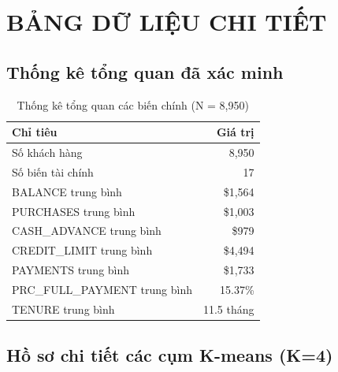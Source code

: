 ﻿\chapter{BẢNG DỮ LIỆU CHI TIẾT}

\section{Thống kê tổng quan đã xác minh}

\begin{table}[H]
\centering
\caption{Thống kê tổng quan các biến chính (N = 8,950)}
\begin{tabular}{|l|r|}
\hline
\textbf{Chỉ tiêu} & \textbf{Giá trị} \\
\hline
Số khách hàng & 8,950 \\
\hline
Số biến tài chính & 17 \\
\hline
BALANCE trung bình & \$1,564 \\
\hline
PURCHASES trung bình & \$1,003 \\
\hline
CASH\_ADVANCE trung bình & \$979 \\
\hline
CREDIT\_LIMIT trung bình & \$4,494 \\
\hline
PAYMENTS trung bình & \$1,733 \\
\hline
PRC\_FULL\_PAYMENT trung bình & 15.37\% \\
\hline
TENURE trung bình & 11.5 tháng \\
\hline
\end{tabular}
\end{table}

\section{Hồ sơ chi tiết các cụm K-means (K=4)}

\begin{table}[H]
\centering
\caption{Tổng hợp đặc trưng 4 cụm khách hàng}
\end{table}

